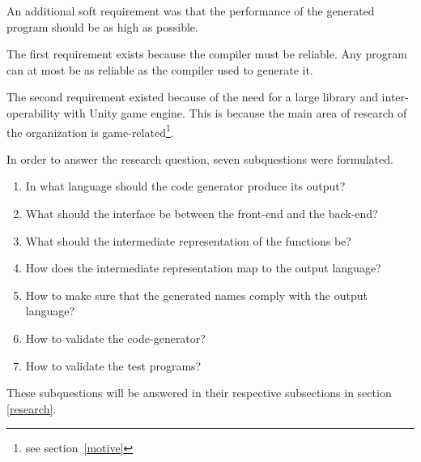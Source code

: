 An additional soft requirement was that the performance of the generated program should be as high as possible.

The first requirement exists because the compiler must be reliable.
Any program can at most be as reliable as the compiler used to generate it.

\label{whydotnet}
The second requirement existed because of the need for a large library and inter-operability with Unity game engine.
This is because the main area of research of the organization is game-related\footnote{see section~\ref{motive}}.

In order to answer the research question, seven subquestions were formulated.

\begin{enumerate}
    \item In what language should the code generator produce its output?
    \item What should the interface be between the front-end and the back-end?
    \item What should the intermediate representation of the functions be?
    \item How does the intermediate representation map to the output language?
    \item How to make sure that the generated names comply with the output language?
    \item How to validate the code-generator?
    \item How to validate the test programs?
\end{enumerate}

These subquestions will be answered in their respective subsections in section \ref{research}.

